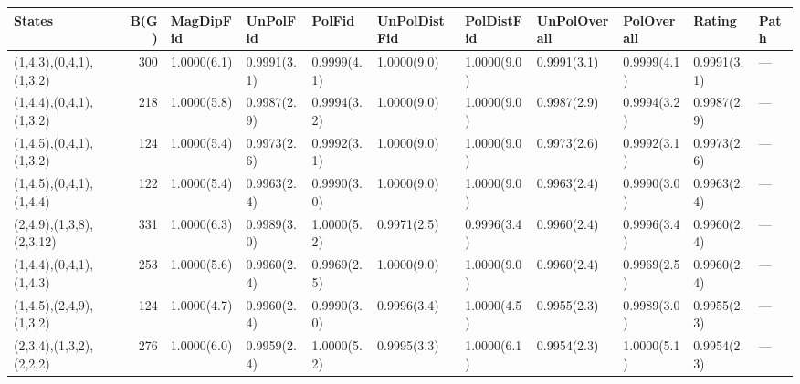 \begin{tabular}{lrlllllllll}
\hline
 States                   &   B(G) & MagDipFid   & UnPolFid    & PolFid      & UnPolDistFid   & PolDistFid   & UnPolOverall   & PolOverall   & Rating      & Path   \\
\hline
 (1,4,3),(0,4,1),(1,3,2)  &    300 & 1.0000(6.1) & 0.9991(3.1) & 0.9999(4.1) & 1.0000(9.0)    & 1.0000(9.0)  & 0.9991(3.1)    & 0.9999(4.1)  & 0.9991(3.1) & ---    \\
 (1,4,4),(0,4,1),(1,3,2)  &    218 & 1.0000(5.8) & 0.9987(2.9) & 0.9994(3.2) & 1.0000(9.0)    & 1.0000(9.0)  & 0.9987(2.9)    & 0.9994(3.2)  & 0.9987(2.9) & ---    \\
 (1,4,5),(0,4,1),(1,3,2)  &    124 & 1.0000(5.4) & 0.9973(2.6) & 0.9992(3.1) & 1.0000(9.0)    & 1.0000(9.0)  & 0.9973(2.6)    & 0.9992(3.1)  & 0.9973(2.6) & ---    \\
 (1,4,5),(0,4,1),(1,4,4)  &    122 & 1.0000(5.4) & 0.9963(2.4) & 0.9990(3.0) & 1.0000(9.0)    & 1.0000(9.0)  & 0.9963(2.4)    & 0.9990(3.0)  & 0.9963(2.4) & ---    \\
 (2,4,9),(1,3,8),(2,3,12) &    331 & 1.0000(6.3) & 0.9989(3.0) & 1.0000(5.2) & 0.9971(2.5)    & 0.9996(3.4)  & 0.9960(2.4)    & 0.9996(3.4)  & 0.9960(2.4) & ---    \\
 (1,4,4),(0,4,1),(1,4,3)  &    253 & 1.0000(5.6) & 0.9960(2.4) & 0.9969(2.5) & 1.0000(9.0)    & 1.0000(9.0)  & 0.9960(2.4)    & 0.9969(2.5)  & 0.9960(2.4) & ---    \\
 (1,4,5),(2,4,9),(1,3,2)  &    124 & 1.0000(4.7) & 0.9960(2.4) & 0.9990(3.0) & 0.9996(3.4)    & 1.0000(4.5)  & 0.9955(2.3)    & 0.9989(3.0)  & 0.9955(2.3) & ---    \\
 (2,3,4),(1,3,2),(2,2,2)  &    276 & 1.0000(6.0) & 0.9959(2.4) & 1.0000(5.2) & 0.9995(3.3)    & 1.0000(6.1)  & 0.9954(2.3)    & 1.0000(5.1)  & 0.9954(2.3) & ---    \\
\hline
\end{tabular}